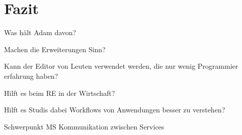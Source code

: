 \chapter{Fazit}\label{ch:fazit}

Was hält Adam davon?

Machen die Erweiterungen Sinn?

Kann der Editor von Leuten verwendet werden, die nur wenig Programmier erfahrung haben?

Hilft es beim RE in der Wirtschaft?

Hilft es Studis dabei Workflows von Anwendungen besser zu verstehen?

Schwerpunkt MS Kommunikation zwischen Services
